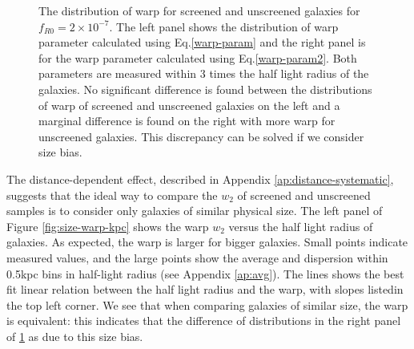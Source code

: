 \documentclass[useAMS,usenatbib,twocolumn]{mn2e}
\begin{document}
\begin{figure}
\begin{center}
\caption{ The distribution of warp for screened and unscreened galaxies for
$f_{R0} = 2\times10^{-7}$.
The left panel shows the distribution of warp parameter calculated using
Eq.\ref{warp-param} and the  right panel is for the warp parameter
calculated using Eq.\ref{warp-param2}. Both parameters are measured within 3
times the half light radius of the galaxies. No significant difference is found
between the distributions of warp of  screened and unscreened galaxies on
the left and a marginal difference is found on the right with more warp
for unscreened galaxies. This discrepancy can be solved if we consider size
bias.}
\label{fig:warp-distr}
\end{center}
\end{figure}

The distance-dependent effect, described in Appendix
\ref{ap:distance-systematic}, suggests that the ideal way to
compare the $w_2$ of screened and unscreened samples is to consider
only galaxies of similar physical size.
The left panel of Figure \ref{fig:size-warp-kpc} shows the
warp $w_2$ versus the half light radius of galaxies. As expected, the
warp is larger for bigger galaxies. Small points indicate measured
values, and the large points show the average and dispersion within
0.5kpc bins in half-light radius (see Appendix \ref{ap:avg}).
The lines shows the best fit linear relation between the
half light radius and the warp, with slopes listedin the top left corner.
We see that when comparing galaxies of similar size, the warp is
equivalent: this indicates that the difference of distributions in the
right panel of \ref{fig:warp-distr} as due to this size bias. 
\end{document}
